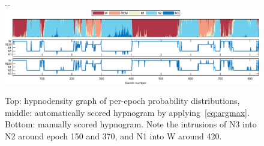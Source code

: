 \begin{figure}[tb]
\begin{adjustwidth*}{}{-\marginparwidth-\marginparsep}
    \centering
    \includegraphics[width=\linewidth]{figures/paper-i/test_maxacc_id1627.eps}
    \caption[\acs{MASSC} hypnodensity example]{Top: hypnodensity graph of per-epoch probability distributions, middle: automatically scored hypnogram by applying~\cref{eq:argmax}. Bottom: manually scored hypnogram. Note the intrusions of \ac{N3} into \ac{N2} around epoch 150 and 370, and \ac{N1} into \ac{W} around 420.}
    \label{fig:slee-stages:hypnodensity}
\end{adjustwidth*}
\end{figure}

